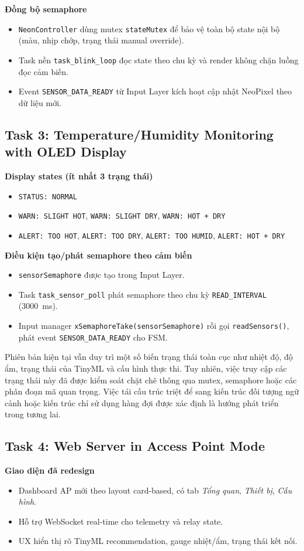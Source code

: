 \textbf{Đồng bộ semaphore}
\begin{itemize}
    \item \texttt{NeonController} dùng mutex \texttt{stateMutex} để bảo vệ toàn bộ state nội bộ (màu, nhịp chớp, trạng thái manual override).
    \item Task nền \texttt{task\_blink\_loop} đọc state theo chu kỳ và render không chặn luồng đọc cảm biến.
    \item Event \texttt{SENSOR\_DATA\_READY} từ Input Layer kích hoạt cập nhật NeoPixel theo dữ liệu mới.
\end{itemize}

\subsection{Task 3: Temperature/Humidity Monitoring with OLED Display}
\textbf{Display states (ít nhất 3 trạng thái)}
\begin{itemize}
    \item \texttt{STATUS: NORMAL}
    \item \texttt{WARN: SLIGHT HOT}, \texttt{WARN: SLIGHT DRY}, \texttt{WARN: HOT + DRY}
    \item \texttt{ALERT: TOO HOT}, \texttt{ALERT: TOO DRY}, \texttt{ALERT: TOO HUMID}, \texttt{ALERT: HOT + DRY}
\end{itemize}

\textbf{Điều kiện tạo/phát semaphore theo cảm biến}
\begin{itemize}
    \item \texttt{sensorSemaphore} được tạo trong Input Layer.
    \item Task \texttt{task\_sensor\_poll} phát semaphore theo chu kỳ \texttt{READ\_INTERVAL} (\SI{3000}{ms}).
    \item Input manager \texttt{xSemaphoreTake(sensorSemaphore)} rồi gọi \texttt{readSensors()}, phát event \texttt{SENSOR\_DATA\_READY} cho FSM.
\end{itemize}

Phiên bản hiện tại vẫn duy trì một số biến trạng thái toàn cục như nhiệt độ, độ ẩm, trạng thái của TinyML và cấu hình thực thi. Tuy nhiên, việc truy cập các trạng thái này đã được kiểm soát chặt chẽ thông qua mutex, semaphore hoặc các phân đoạn mã quan trọng. Việc tái cấu trúc triệt để sang kiến trúc đối tượng ngữ cảnh hoặc kiến trúc chỉ sử dụng hàng đợi được xác định là hướng phát triển trong tương lai.

\subsection{Task 4: Web Server in Access Point Mode}
\textbf{Giao diện đã redesign}
\begin{itemize}
    \item Dashboard AP mới theo layout card-based, có tab \textit{Tổng quan}, \textit{Thiết bị}, \textit{Cấu hình}.
    \item Hỗ trợ WebSocket real-time cho telemetry và relay state.
    \item UX hiển thị rõ TinyML recommendation, gauge nhiệt/ẩm, trạng thái kết nối.
\end{itemize}

